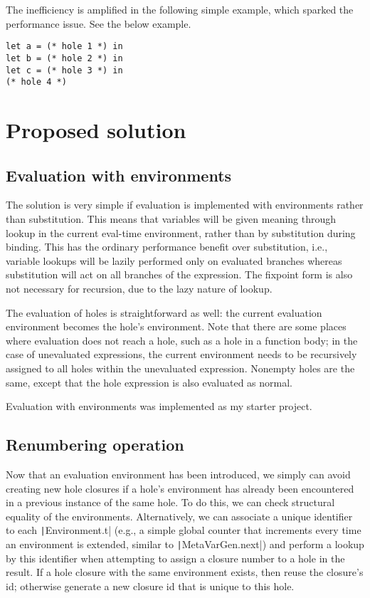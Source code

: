 \documentclass{article}
\begin{document}
The inefficiency is amplified in the following simple example, which sparked the performance issue. See the below example.
\begin{verbatim}
let a = (* hole 1 *) in
let b = (* hole 2 *) in
let c = (* hole 3 *) in
(* hole 4 *)
\end{verbatim}



\section{Proposed solution}
\subsection{Evaluation with environments}
The solution is very simple if evaluation is implemented with environments rather than substitution. This means that variables will be given meaning through lookup in the current eval-time environment, rather than by substitution during binding. This has the ordinary performance benefit over substitution, i.e., variable lookups will be lazily performed only on evaluated branches whereas substitution will act on all branches of the expression. The fixpoint form is also not necessary for recursion, due to the lazy nature of lookup.

The evaluation of holes is straightforward as well: the current evaluation environment becomes the hole's environment. Note that there are some places where evaluation does not reach a hole, such as a hole in a function body; in the case of unevaluated expressions, the current environment needs to be recursively assigned to all holes within the unevaluated expression. Nonempty holes are the same, except that the hole expression is also evaluated as normal.

Evaluation with environments was implemented as my starter project.

\subsection{Renumbering operation}
Now that an evaluation environment has been introduced, we simply can avoid creating new hole closures if a hole's environment has already been encountered in a previous instance of the same hole. To do this, we can check structural equality of the environments. Alternatively, we can associate a unique identifier to each \texttt|Environment.t| (e.g., a simple global counter that increments every time an environment is extended, similar to \texttt|MetaVarGen.next|) and perform a lookup by this identifier when attempting to assign a closure number to a hole in the result. If a hole closure with the same environment exists, then reuse the closure's id; otherwise generate a new closure id that is unique to this hole.
\end{document}
